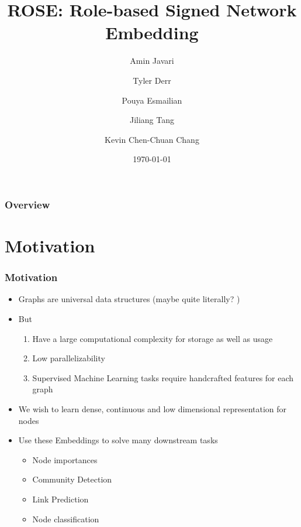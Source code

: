 \documentclass{beamer}
\title[Signed Network Embeddings]{ROSE: Role-based Signed Network Embedding
}
\author[Javari et al.]{Amin Javari \and Tyler Derr \and Pouya Esmailian \and Jiliang Tang \and Kevin Chen-Chuan Chang}
\date{\today}
\begin{document}
\begin{frame}
    \titlepage
\end{frame}

\begin{frame}
    \frametitle{Overview}
    \tableofcontents
\end{frame}


\section{Motivation}
\begin{frame}
    \frametitle{Motivation}

    \begin{itemize}
        
        \item Graphs are universal data structures (maybe quite literally? \cite{wolfram2020class})
        \item But
        \begin{enumerate}
            \item Have a large computational complexity for storage as well as usage
            \item Low parallelizability
            \item Supervised Machine Learning tasks require handcrafted features for each graph
        \end{enumerate}
        \item We wish to learn dense, continuous and low dimensional representation  for nodes \cite{Cui_2019Survey}
        \item Use these Embeddings to solve many downstream tasks
        \begin{itemize}
            \item Node importances
            \item Community Detection
            \item Link Prediction
            \item Node classification
        \end{itemize}
    \end{itemize}

\end{frame}
\end{document}
